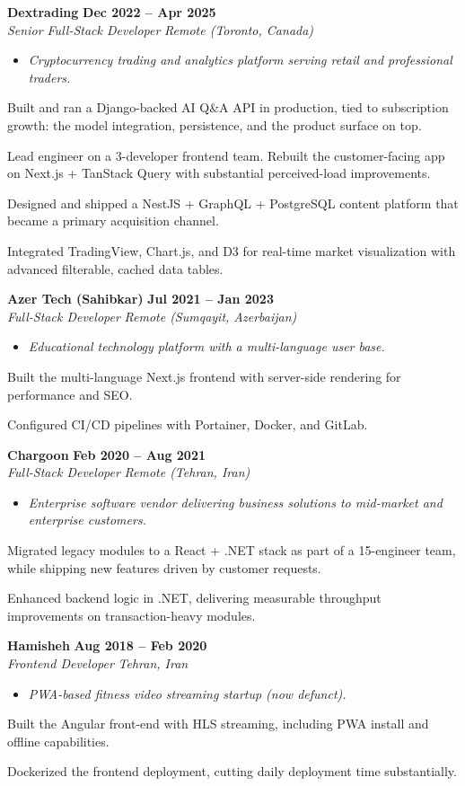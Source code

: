 \documentclass[letterpaper,10pt]{article}
\newcommand{\heading}[2]{
  \hspace{10pt}#1\hfill#2\\
}
\newcommand{\headingBf}[2]{
  \heading{\textbf{#1}}{\textbf{#2}}
}
\newcommand{\headingIt}[2]{
  \heading{\textit{#1}}{\textit{#2}}
}
\newenvironment{resume_list}{
  \vspace{-7pt}
  \begin{itemize}[itemsep=-2px, parsep=1pt, leftmargin=30pt]
}{
  \end{itemize}
  \vspace{1pt}
}
\newcommand{\companyDescription}[1]{
  \vspace{-7pt}
  \begin{itemize}[itemsep=-2px, parsep=1pt, leftmargin=12pt]
    \item[] {\color{textMuted}\textit{#1}}
  \end{itemize}
  \vspace{-4pt}
}
\begin{document}
  \headingBf{ Dextrading }{ Dec 2022 -- Apr 2025 }
  \headingIt{ Senior Full-Stack Developer }{ Remote (Toronto, Canada) }
  \companyDescription{ Cryptocurrency trading and analytics platform serving retail and professional traders. }
  \begin{resume_list}
    \item Built and ran a Django-backed AI Q\&A API in production, tied to subscription growth: the model integration, persistence, and the product surface on top.
    \item Lead engineer on a 3-developer frontend team. Rebuilt the customer-facing app on Next.js + TanStack Query with substantial perceived-load improvements.
    \item Designed and shipped a NestJS + GraphQL + PostgreSQL content platform that became a primary acquisition channel.
    \item Integrated TradingView, Chart.js, and D3 for real-time market visualization with advanced filterable, cached data tables.
  \end{resume_list}

  \headingBf{ Azer Tech (Sahibkar) }{ Jul 2021 -- Jan 2023 }
  \headingIt{ Full-Stack Developer }{ Remote (Sumqayit, Azerbaijan) }
  \companyDescription{ Educational technology platform with a multi-language user base. }
  \begin{resume_list}
    \item Built the multi-language Next.js frontend with server-side rendering for performance and SEO.
    \item Configured CI/CD pipelines with Portainer, Docker, and GitLab.
  \end{resume_list}

  \headingBf{ Chargoon }{ Feb 2020 -- Aug 2021 }
  \headingIt{ Full-Stack Developer }{ Remote (Tehran, Iran) }
  \companyDescription{ Enterprise software vendor delivering business solutions to mid-market and enterprise customers. }
  \begin{resume_list}
    \item Migrated legacy modules to a React + .NET stack as part of a 15-engineer team, while shipping new features driven by customer requests.
    \item Enhanced backend logic in .NET, delivering measurable throughput improvements on transaction-heavy modules.
  \end{resume_list}

  \headingBf{ Hamisheh }{ Aug 2018 -- Feb 2020 }
  \headingIt{ Frontend Developer }{ Tehran, Iran }
  \companyDescription{ PWA-based fitness video streaming startup (now defunct). }
  \begin{resume_list}
    \item Built the Angular front-end with HLS streaming, including PWA install and offline capabilities.
    \item Dockerized the frontend deployment, cutting daily deployment time substantially.
  \end{resume_list}
\end{document}
